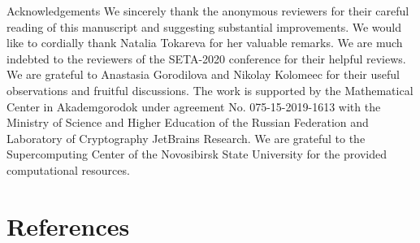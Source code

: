 \documentclass[10pt]{article}
\begin{document}
Acknowledgements We sincerely thank the anonymous reviewers for their careful reading of this manuscript and suggesting substantial improvements. We would like to cordially thank Natalia Tokareva for her valuable remarks. We are much indebted to the reviewers of the SETA-2020 conference for their helpful reviews. We are grateful to Anastasia Gorodilova and Nikolay Kolomeec for their useful observations and fruitful discussions. The work is supported by the Mathematical Center in Akademgorodok under agreement No. 075-15-2019-1613 with the Ministry of Science and Higher Education of the Russian Federation and Laboratory of Cryptography JetBrains Research. We are grateful to the Supercomputing Center of the Novosibirsk State University for the provided computational resources.

\section*{References}
\end{document}
